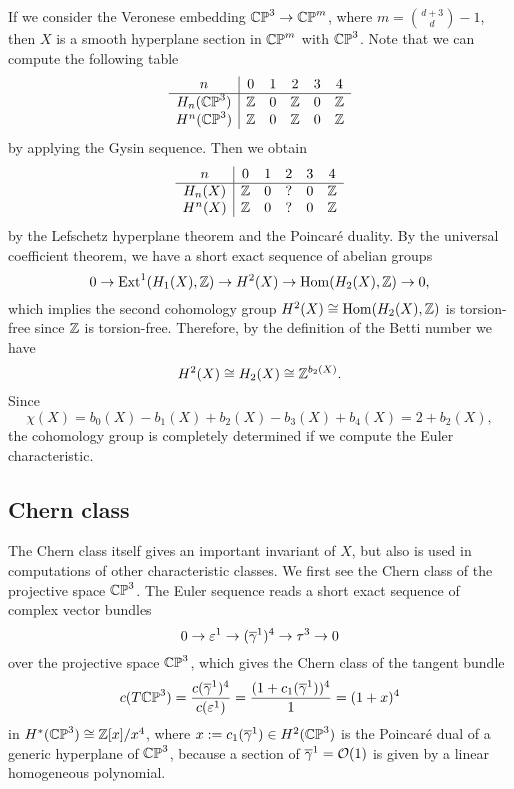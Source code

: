 \documentclass{../../../small}
\begin{document}
If we consider the Veronese embedding $\mathbb{CP}^3\to\mathbb{CP}^m$, where $m={d+3\choose d}-1$, then $X$ is a smooth hyperplane section in $\mathbb{CP}^m$ with $\mathbb{CP}^3$.
Note that we can compute the following table
\[\begin{array}{c|ccccc}
n&0&1&2&3&4\\\hline
H_n(\mathbb{CP}^3)&\mathbb{Z}&0&\mathbb{Z}&0&\mathbb{Z}\\
H^n(\mathbb{CP}^3)&\mathbb{Z}&0&\mathbb{Z}&0&\mathbb{Z}
\end{array}\]
by applying the Gysin sequence.
Then we obtain
\[\begin{array}{c|ccccc}
n&0&1&2&3&4\\\hline
H_n(X)&\mathbb{Z}&0&?&0&\mathbb{Z}\\
H^n(X)&\mathbb{Z}&0&?&0&\mathbb{Z}
\end{array}\]
by the Lefschetz hyperplane theorem and the Poincar\'e duality.
By the universal coefficient theorem, we have a short exact sequence of abelian groups
\[0\to\operatorname{Ext}^1(H_1(X),\mathbb{Z})\to H^2(X)\to\operatorname{Hom}(H_2(X),\mathbb{Z})\to0,\]
which implies the second cohomology group $H^2(X)\cong\operatorname{Hom}(H_2(X),\mathbb{Z})$ is torsion-free since $\mathbb{Z}$ is torsion-free.
Therefore, by the definition of the Betti number we have
\[H^2(X)\cong H_2(X)\cong\mathbb{Z}^{b_2(X)}.\]
Since
\[\chi(X)=b_0(X)-b_1(X)+b_2(X)-b_3(X)+b_4(X)=2+b_2(X),\]
the cohomology group is completely determined if we compute the Euler characteristic.


\subsection{Chern class}

The Chern class itself gives an important invariant of $X$, but also is used in computations of other characteristic classes.
We first see the Chern class of the projective space $\mathbb{CP}^3$.
The Euler sequence reads a short exact sequence of complex vector bundles
\[0\to\varepsilon^1\to(\overline\gamma^1)^4\to\tau^3\to0\]
over the projective space $\mathbb{CP}^3$, which gives the Chern class of the tangent bundle
\[c(T\mathbb{CP}^3)=\frac{c(\overline\gamma^1)^4}{c(\varepsilon^1)}=\frac{(1+c_1(\overline\gamma^1))^4}{1}=(1+x)^4\]
in $H^*(\mathbb{CP}^3)\cong\mathbb{Z}[x]/x^4$, where $x:=c_1(\overline\gamma^1)\in H^2(\mathbb{CP}^3)$ is the Poincar\'e dual of a generic hyperplane of $\mathbb{CP}^3$, because a section of $\overline\gamma^1=\mathcal{O}(1)$ is given by a linear homogeneous polynomial.
\end{document}
